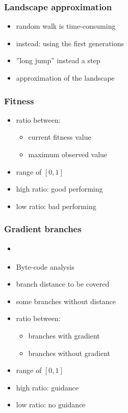 \begin{frame}
	\frametitle{Landscape approximation}
	
	\begin{itemize}
		\item random walk is time-consuming
		\item instead: using the first generations
		\item ''long jump'' instead a step \cite{Kauffman.1987}
		\item approximation of the landscape
	\end{itemize}
	
\end{frame}

\begin{frame}
	\frametitle{Fitness}
	
	\begin{itemize}
		\item ratio between:
		\begin{itemize}
			\item current fitness value
			\item maximum observed value
		\end{itemize}
		\item range of $[0,1]$
		\item high ratio: good performing
		\item low ratio: bad performing
	\end{itemize}
	
\end{frame}

\begin{frame}
	\frametitle{Gradient branches}
	
	\begin{itemize}
		\item \cite{Shamshiri.2015}
		\item Byte-code analysis
		\item branch distance to be covered
		\item some branches without distance
		\item ratio between:
		\begin{itemize}
			\item branches with gradient
			\item branches without gradient
		\end{itemize}
		\item range of $[0,1]$
		\item high ratio: guidance
		\item low ratio: no guidance
	\end{itemize}
	
\end{frame}

